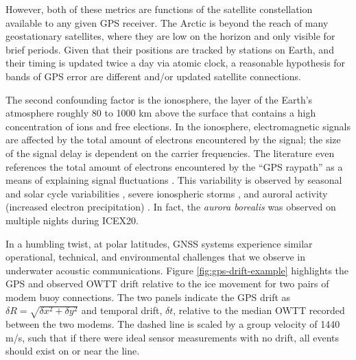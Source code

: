 However, both of these metrics are functions of the satellite constellation available to any given GPS receiver.
The Arctic is beyond the reach of many geostationary satellites, where they are low on the horizon and only visible for brief periods.
Given that their positions are tracked by stations on Earth, and their timing is updated twice a day via atomic clock, a reasonable hypothesis for bands of GPS error are different and/or updated satellite connections.

The second confounding factor is the ionosphere, the layer of the Earth's atmosphere roughly 80 to 1000 km above the surface that contains a high concentration of ions and free elections. 
In the ionosphere, electromagnetic signals are affected by the total amount of electrons encountered by the signal; the size of the signal delay is dependent on the carrier frequencies.
The literature even references the total amount of electrons encountered by the ``GPS raypath'' as a means of explaining signal fluctuations \citep{themens_nature_2015}.
This variability is observed by seasonal and solar cycle variabilities \citep{themens_nature_2015}, severe ionospheric storms \citep{mitchell_gps_2005}, and auroral activity (increased electron precipitation) \citep{jin_gps_2014,gwal_gps_2011}.
In fact, the \textit{aurora borealis} was observed on multiple nights during ICEX20.

In a humbling twist, at polar latitudes, GNSS systems experience similar operational, technical, and environmental challenges that we observe in underwater acoustic communications.
Figure \ref{fig:gps-drift-example} highlights the GPS and observed OWTT drift relative to the ice movement for two pairs of modem buoy connections.
The two panels indicate the GPS drift as $\delta R = \sqrt{\delta x^2 + \delta y^2}$ and temporal drift, $\delta t$, relative to the median OWTT recorded between the two modems.
The dashed line is scaled by a group velocity of 1440 m/s, such that if there were ideal sensor measurements with no drift, all events should exist on or near the line.

